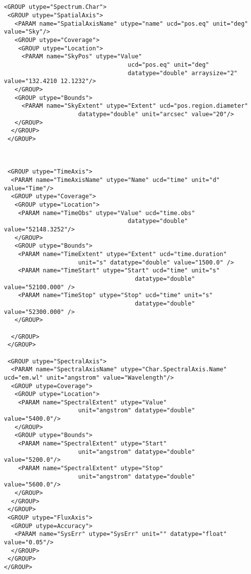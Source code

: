 {\begin{flushleft}
\begin{fmpage}
\begin{verbatim}
\end{verbatim}
\end{fmpage}

\begin{fmpage}
\begin{verbatim}


<GROUP utype="Spectrum.Char">
 <GROUP utype="SpatialAxis">
   <PARAM name="SpatialAxisName" utype="name" ucd="pos.eq" unit="deg" value="Sky"/>
   <GROUP utype="Coverage">
    <GROUP utype="Location">
     <PARAM name="SkyPos" utype="Value" 
                                   ucd="pos.eq" unit="deg" 
                                   datatype="double" arraysize="2" value="132.4210 12.1232"/>
   </GROUP>
   <GROUP utype="Bounds">
     <PARAM name="SkyExtent" utype="Extent" ucd="pos.region.diameter" 
                     datatype="double" unit="arcsec" value="20"/>
   </GROUP>
  </GROUP>
 </GROUP>



 <GROUP utype="TimeAxis">
  <PARAM name="TimeAxisName" utype="Name" ucd="time" unit="d" value="Time"/>
  <GROUP utype="Coverage">
   <GROUP utype="Location">
    <PARAM name="TimeObs" utype="Value" ucd="time.obs"
                                   datatype="double" value="52148.3252"/>
   </GROUP>
   <GROUP utype="Bounds">
    <PARAM name="TimeExtent" utype="Extent" ucd="time.duration"
                     unit="s" datatype="double" value="1500.0" />
    <PARAM name="TimeStart" utype="Start" ucd="time" unit="s" 
                                     datatype="double" value="52100.000" />
    <PARAM name="TimeStop" utype="Stop" ucd="time" unit="s" 
                                     datatype="double" value="52300.000" />
   </GROUP>

  </GROUP>
 </GROUP>

 <GROUP utype="SpectralAxis">
  <PARAM name="SpectralAxisName" utype="Char.SpectralAxis.Name" ucd="em.wl" unit="angstrom" value="Wavelength"/>
  <GROUP utype=Coverage">
   <GROUP utype="Location">
    <PARAM name="SpectralExtent" utype="Value" 
                     unit="angstrom" datatype="double" value="5400.0"/>
   </GROUP>
   <GROUP utype="Bounds">
    <PARAM name="SpectralExtent" utype="Start" 
                     unit="angstrom" datatype="double" value="5200.0"/>
    <PARAM name="SpectralExtent" utype="Stop"
                     unit="angstrom" datatype="double" value="5600.0"/>
   </GROUP>
  </GROUP>
 </GROUP>
 <GROUP utype="FluxAxis">
  <GROUP utype=Accuracy">
   <PARAM name="SysErr" utype="SysErr" unit="" datatype="float" value="0.05"/>
  </GROUP>
 </GROUP>
</GROUP>
 

\end{verbatim}
\end{fmpage}
\end{flushleft}}
